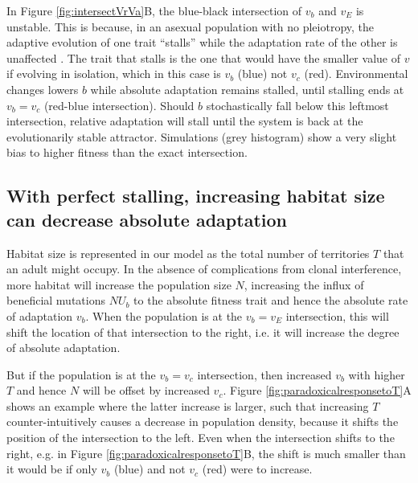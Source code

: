 \documentclass[9pt,twocolumn,twoside,lineno]{gsajnl}
\begin{document}
In Figure \ref{fig:intersectVrVa}B, the blue-black intersection of $v_b$ and $v_E$ is unstable. This is because, in an asexual population with no pleiotropy, the adaptive evolution of one trait ``stalls'' while the adaptation rate of the other is unaffected \citep{gomezetal2020}.  The trait that stalls is the one that would have the smaller value of $v$ if evolving in isolation, which in this case is $v_b$ (blue) not $v_c$ (red). Environmental changes lowers $b$ while absolute adaptation remains stalled, until stalling ends at $v_b=v_c$ (red-blue intersection). Should $b$ stochastically fall below this leftmost intersection, relative adaptation will stall until the system is back at the evolutionarily stable attractor. Simulations (grey histogram) show a very slight bias to higher fitness than the exact intersection.

\subsection{With perfect stalling, increasing habitat size can decrease absolute adaptation} 
\label{sec:results:TerritorySize}

Habitat size is represented in our model as the total number of territories $T$ that an adult might occupy. In the absence of complications from clonal interference, more habitat will increase the population size $N$, increasing the influx of beneficial mutations $N U_b$ to the absolute fitness trait and hence the absolute rate of adaptation $v_b$. When the population is at the $v_b=v_E$ intersection, this will shift the location of that intersection to the right, i.e. it will increase the degree of absolute adaptation.

But if the population is at the $v_b=v_c$ intersection, then increased $v_b$ with higher $T$ and hence $N$ will be offset by increased $v_c$. Figure \ref{fig:paradoxicalresponsetoT}A shows an example where the latter increase is larger, such that increasing $T$ counter-intuitively causes a decrease in population density, because it  shifts the position of the intersection to the left. Even when the intersection shifts to the right, e.g. in Figure \ref{fig:paradoxicalresponsetoT}B, the shift is much smaller than it would be if only $v_b$ (blue) and not $v_c$ (red) were to increase.
\end{document}
